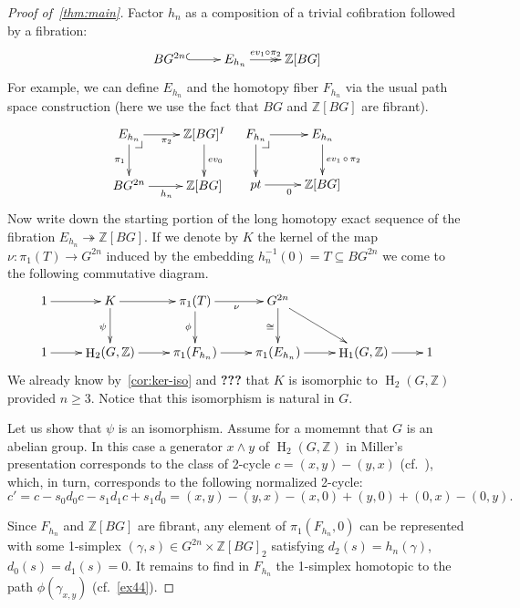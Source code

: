 \documentclass[oneside, 12pt]{amsart}
\makeatletter
\theoremstyle{plain}
\numberwithin{equation}{section}
\numberwithin{lemma}{section}
\theoremstyle{remark}
\theoremstyle{definition}
\DeclareMathOperator{\HH}{H}
\newcommand{\ZZ}{\mathbb{Z}}
\newcommand{\pullbackcorner}[1][dr]{\save*!/#1-1.2pc/#1:(-1,1)@^{|-}\restore}
\makeatother
\begin{document}
\begin{proof}[Proof of~\cref{thm:main}]
Factor $h_n$ as a composition of a trivial cofibration followed by a fibration: 
\begin{equation} \label{eq:fibr-repl} \xymatrix{BG^{2n} \ar@{^{(}->}[r] & E_{h_n} \ar@{->>}^(.45){ev_1 \circ \pi_2}[r] & \ZZ[BG]} \end{equation}
For example, we can define $E_{h_n}$ and the homotopy fiber $F_{h_n}$ via the usual path space construction
 (here we use the fact that $BG$ and $\ZZ[BG]$ are fibrant).
\[ \xymatrix{ E_{h_n}  \ar[r]_{\pi_2} \ar[d]_{\pi_1} \pullbackcorner & \ar[d]^{ev_0} \ZZ[BG]^I\\
              BG^{2n} \ar[r]_{h_n} & \ZZ[BG] } \ \ \ 
   \xymatrix{ F_{h_n}  \ar[r] \ar[d] \pullbackcorner & \ar[d]^{ev_1\,\circ\,\pi_2} E_{h_n} \\
              pt \ar[r]_{0} & \ZZ[BG]}  \]
Now write down the starting portion of the long homotopy exact sequence of the fibration $E_{h_n} \twoheadrightarrow \ZZ[BG]$.
If we denote by $K$ the kernel of the map $\nu\colon \pi_1(T) \to G^{2n}$ induced by the embedding $h_n^{-1}(0)=T \subseteq BG^{2n}$ we 
 come to the following commutative diagram.
\[ \xymatrix{1 \ar[r] & K       \ar[d]_{\psi} \ar[r] & \pi_1(T) \ar[d]_{\phi} \ar[r]_{\nu}     & G^{2n} \ar[rd] \ar[d]_{\cong} &                      & \\
             1 \ar[r] & \HH_2(G, \ZZ) \ar[r] & \pi_1(F_{h_n})           \ar[r]  & \pi_1(E_{h_n}) \ar[r]  & \HH_1(G, \ZZ) \ar[r] & 1}\]
We already know by~\cref{cor:ker-iso} and {\bf ???} that $K$ is isomorphic to $\HH_2(G, \ZZ)$ provided $n\geq 3$.
Notice that this isomorphism is natural in $G$.

Let us show that $\psi$ is an isomorphism. Assume for a momemnt that $G$ is an abelian group.
In this case a generator $x \wedge y$ of $\HH_2(G, \ZZ)$ in Miller's presentation corresponds to the class of 2-cycle $c = (x, y) - (y, x)$ (cf.~\cite[(14), p.~582]{Mi52}), which,
  in turn, corresponds to the following normalized 2-cycle:
\begin{equation} \label{eq:normalized} c' = c - s_0d_0c - s_1d_1c + s_1d_0 = (x, y) - (y, x) - (x, 0) +(y, 0) + (0, x) - (0, y). \end{equation}
 
Since $F_{h_n}$ and $\ZZ[BG]$ are fibrant, any element of $\pi_1(F_{h_n}, 0)$ can be represented with 
 some 1-simplex $(\gamma, s) \in G^{2n} \times \ZZ[BG]_2$ satisfying $d_2(s) = h_n(\gamma)$, $d_0(s) = d_1(s)=0$. 
It remains to find in $F_{h_n}$ the 1-simplex homotopic to the path $\phi(\gamma_{x,y})$ (cf.~\cref{ex44}).


\end{proof}
\end{document}
